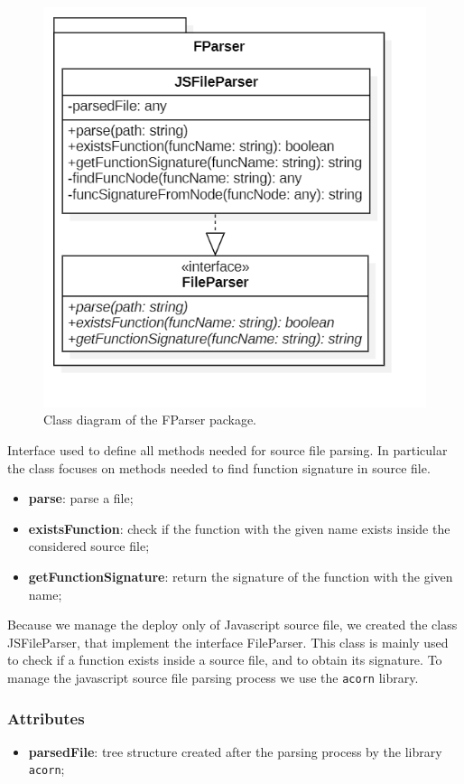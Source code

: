 		\begin{figure} [h!]
			\centering
			\includegraphics[width=0.5\linewidth]{diagrammi/etherless-cli/FParser}
			\caption{Class diagram of the FParser package.}
		\end{figure}
		
			Interface used to define all methods needed for source file parsing. In particular the class focuses on methods needed to find function signature in source file. 
		
					\begin{itemize}
						\item \textbf{parse}: parse a file;   
						\item \textbf{existsFunction}: check if the function with the given name exists inside the considered source file;
						\item \textbf{getFunctionSignature}: return the signature of the function with the given name;
					\end{itemize}
		
			Because we manage the deploy only of Javascript source file, we created the class JSFileParser, that implement the interface FileParser. This class is mainly used to check if a function exists inside a source file, and to obtain its signature. To manage the javascript source file parsing process we use the \texttt{acorn} library. 
			
				\subsubsection*{Attributes}
					\begin{itemize}
						\item \textbf{parsedFile}: tree structure created after the parsing process by the library \texttt{acorn}; 
					\end{itemize}
				
